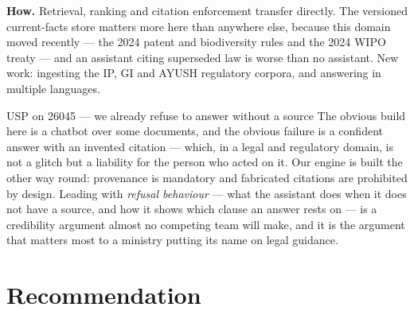\documentclass[11pt]{article}
\begin{document}
\vspace{0.5em}
\noindent\textbf{How.} Retrieval, ranking and citation enforcement transfer directly. The versioned
current-facts store matters more here than anywhere else, because this domain moved recently --- the 2024
patent and biodiversity rules and the 2024 WIPO treaty --- and an assistant citing superseded law is worse
than no assistant. New work: ingesting the IP, GI and AYUSH regulatory corpora, and answering in multiple
languages.

\begin{uspbox}{USP on 26045 --- we already refuse to answer without a source}
The obvious build here is a chatbot over some documents, and the obvious failure is a confident answer
with an invented citation --- which, in a legal and regulatory domain, is not a glitch but a liability for
the person who acted on it. Our engine is built the other way round: provenance is mandatory and
fabricated citations are prohibited by design. Leading with \emph{refusal behaviour} --- what the
assistant does when it does not have a source, and how it shows which clause an answer rests on --- is a
credibility argument almost no competing team will make, and it is the argument that matters most to a
ministry putting its name on legal guidance.
\end{uspbox}

\clearpage
\section{Recommendation}
\end{document}
